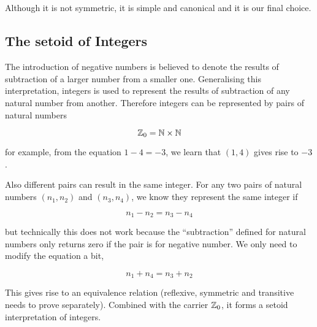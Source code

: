 \begin{code}%
\\
\>  \AgdaSymbol{:}  \<%
\\
\>[0]\<[2]%
\>[2]\AgdaInductiveConstructor{+\_} \<[8]%
\>[8]\AgdaSymbol{:}   \<%
\\
\>[0]\<[2]%
\>[2] \AgdaSymbol{:}   \<%
\\
\>\<\end{code}

Although it is not symmetric, it is simple and canonical and it is our
final choice.

\subsection{The setoid of Integers}

The introduction of negative numbers is believed to denote the results
of subtraction of a larger number from a smaller one. Generalising this interpretation,
integers is used to represent the results of subtraction of any
natural number from another. 
Therefore integers can be represented by pairs of natural numbers

$$\mathbb{Z}_0=\mathbb{N} \times \mathbb{N}$$

for example, from the equation $1 - 4 = - 3$, we learn that $(1,4)$ gives rise to $- 3$.

Also different pairs can result in the same integer.
For any two pairs of natural
numbers $(n_1, n_2)$ and $(n_3, n_4)$, we know they represent the same
integer if

$$ n_1 - n_2 = n_3 - n_4$$

but technically this does not work because the ``subtraction'' defined for natural
numbers only returns zero if the pair is for negative number. We only
need to modify the equation a bit,

$$ n_1 + n_4 = n_3 + n_2$$

This gives rise to an equivalence relation (reflexive, symmetric and
transitive needs to prove separately). Combined with the carrier
$\mathbb{Z}_0$, it forms a setoid interpretation of integers.

